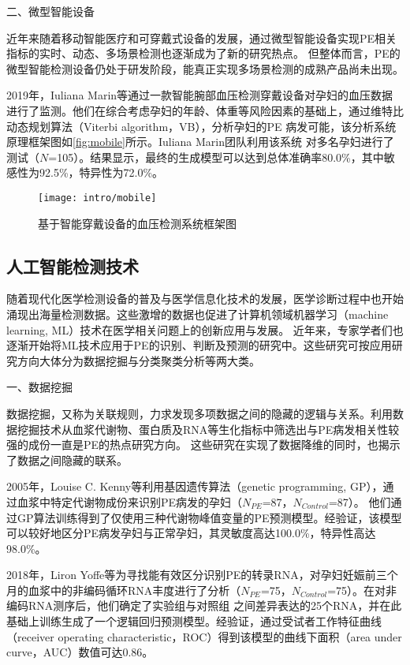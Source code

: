 二、微型智能设备

近年来随着移动智能医疗和可穿戴式设备的发展，通过微型智能设备实现PE相关指标的实时、动态、多场景检测也逐渐成为了新的研究热点。
但整体而言，PE的微型智能检测设备仍处于研发阶段，能真正实现多场景检测的成熟产品尚未出现。

2019年，Iuliana Marin等\cite{Marin2019,Marin2020}通过一款智能腕部血压检测穿戴设备对孕妇的血压数据进行了监测。他们在综合考虑孕妇的年龄、体重等风险因素的基础上，通过维特比动态规划算法（Viterbi algorithm，VB），分析孕妇的PE
病发可能，该分析系统原理框架图如\autoref{fig:mobile}所示。Iuliana Marin团队利用该系统
对多名孕妇进行了测试（$N$=105）。结果显示，最终的生成模型可以达到总体准确率80.0\%，其中敏感性为92.5\%，特异性为72.0\%\cite{Marin2019}。
\begin{figure}[htbp]
    \centering
    \texttt{[image: intro/mobile]}
    \caption[基于智能穿戴设备的血压检测系统框架图]{\label{fig:mobile}基于智能穿戴设备的血压检测系统框架图\cite{Marin2019,Marin2020}}
\end{figure}

\subsection{人工智能检测技术}
随着现代化医学检测设备的普及与医学信息化技术的发展，医学诊断过程中也开始涌现出海量检测数据。这些激增的数据也促进了计算机领域机器学习（machine learning, ML）技术在医学相关问题上的创新应用与发展。
近年来，专家学者们也逐渐开始将ML技术应用于PE的识别、判断及预测的研究中。这些研究可按应用研究方向大体分为数据挖掘与分类聚类分析等两大类\cite{Mehta2016}。

一、数据挖掘

数据挖掘，又称为关联规则，力求发现多项数据之间的隐藏的逻辑与关系\cite{Han2006}。利用数据挖掘技术从血浆代谢物、蛋白质及RNA等生化指标中筛选出与PE病发相关性较强的成份一直是PE的热点研究方向。
这些研究在实现了数据降维的同时，也揭示了数据之间隐藏的联系。

2005年，Louise C. Kenny等\cite{Kenny2005}利用基因遗传算法（genetic programming, GP），通过血浆中特定代谢物成份来识别PE病发的孕妇（$N_{PE}$=87，$N_{Control}$=87）。
他们通过GP算法训练得到了仅使用三种代谢物峰值变量的PE预测模型。经验证，该模型可以较好地区分PE病发孕妇与正常孕妇，其灵敏度高达100.0\%，特异性高达98.0\%。

2018年，Liron Yoffe等\cite{Yoffe2018}为寻找能有效区分识别PE的转录RNA，对孕妇妊娠前三个月的血浆中的非编码循环RNA丰度进行了分析（$N_{PE}$=75，$N_{Control}$=75）。在对非编码RNA测序后，他们确定了实验组与对照组
之间差异表达的25个RNA，并在此基础上训练生成了一个逻辑回归预测模型。经验证，通过受试者工作特征曲线（receiver operating characteristic，ROC）得到该模型的曲线下面积（area under curve，AUC）数值可达0.86。


